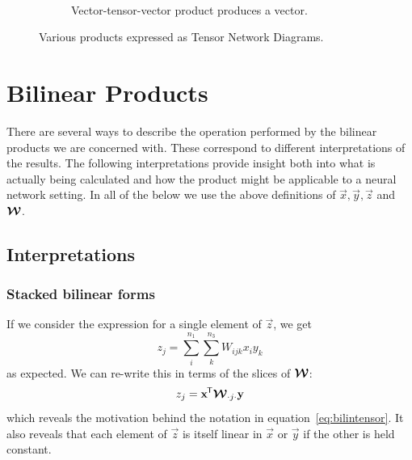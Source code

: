 \begin{figure}
\begin{subfigure}[t]{0.45\textwidth}
	\end{subfigure} ~
	\begin{subfigure}[t]{0.45\textwidth}
		\centering
		\caption{Vector-tensor-vector product produces a vector.}
		\label{fig:vanillabilintnd}
	\end{subfigure}
	\caption{Various products expressed as Tensor Network Diagrams.}
	\label{fig:tnprods}
\end{figure}

\section{Bilinear Products}
There are several ways to describe the operation performed by the bilinear products we are
concerned with. These correspond to different interpretations of the results. The following
interpretations provide insight both into what is actually being calculated and how the product might
be applicable to a neural network setting. In all of the below we use the above definitions of
\(\vec{x}, \vec{y}, \vec{z}\) and \(\bm{\mathcal{W}}\).

\subsection{Interpretations}\label{sec:tensorinterps}
\subsubsection{Stacked bilinear forms}
If we consider the expression for a single element of \(\vec{z}\), we get
\begin{equation} \label{eq:singlezsum}
	z_j = \sum_i^{n_1} \sum_k^{n_3} W_{ijk} x_i y_k
\end{equation} as expected. We can re-write this in terms of the slices of \(\bm{\mathcal{W}}\):
\begin{equation}\label{eq:singlezslice}
	z_j = \mathbf{x}^{\mkern-1.5mu\mathsf{T}}\bm{\mathcal{W}}_{\cdot j \cdot}\mathbf{y}
\end{equation} which reveals the motivation behind the notation in equation~\eqref{eq:bilintensor}.
It also reveals that each element of \(\vec{z}\) is itself linear in \(\vec{x}\) or \(\vec{y}\) if
the other is held constant.

